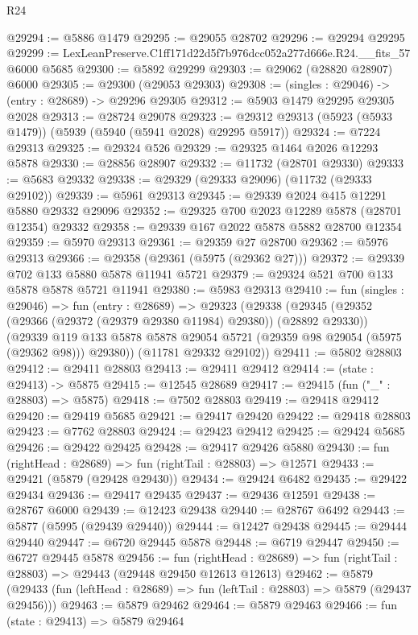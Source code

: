 \begin{lexlean}{R24}
\begin{coremodule}
@29294 := @5886 @1479
@29295 := @29055 @28702
@29296 := @29294 @29295
@29299 := LexLeanPreserve.C1ff171d22d5f7b976dcc052a277d666e.R24.__fits_57 @6000 @5685
@29300 := @5892 @29299
@29303 := @29062 (@28820 @28907) @6000
@29305 := @29300 (@29053 @29303)
@29308 := (singles : @29046) -> (entry : @28689) -> @29296 @29305
@29312 := @5903 @1479 @29295 @29305 @2028
@29313 := @28724 @29078
@29323 := @29312 @29313 (@5923 (@5933 @1479)) (@5939 (@5940 (@5941 @2028) @29295 @5917))
@29324 := @7224 @29313
@29325 := @29324 @526
@29329 := @29325 @1464 @2026 @12293 @5878
@29330 := @28856 @28907
@29332 := @11732 (@28701 @29330)
@29333 := @5683 @29332
@29338 := @29329 (@29333 @29096) (@11732 (@29333 @29102))
@29339 := @5961 @29313
@29345 := @29339 @2024 @415 @12291 @5880 @29332 @29096
@29352 := @29325 @700 @2023 @12289 @5878 (@28701 @12354) @29332
@29358 := @29339 @167 @2022 @5878 @5882 @28700 @12354
@29359 := @5970 @29313
@29361 := @29359 @27 @28700
@29362 := @5976 @29313
@29366 := @29358 (@29361 (@5975 (@29362 @27)))
@29372 := @29339 @702 @133 @5880 @5878 @11941 @5721
@29379 := @29324 @521 @700 @133 @5878 @5878 @5721 @11941
@29380 := @5983 @29313
@29410 := fun (singles : @29046) =>
  fun (entry : @28689) =>
  @29323
    (@29338
      (@29345
        (@29352 (@29366 (@29372 (@29379 @29380 @11984) @29380)) (@28892 @29330))
        (@29339 @119 @133 @5878 @5878 @29054 @5721 (@29359 @98 @29054 (@5975 (@29362 @98))) @29380))
      (@11781 @29332 @29102))
@29411 := @5802 @28803
@29412 := @29411 @28803
@29413 := @29411 @29412
@29414 := (state : @29413) -> @5875
@29415 := @12545 @28689
@29417 := @29415 (fun ("_" : @28803) => @5875)
@29418 := @7502 @28803
@29419 := @29418 @29412
@29420 := @29419 @5685
@29421 := @29417 @29420
@29422 := @29418 @28803
@29423 := @7762 @28803
@29424 := @29423 @29412
@29425 := @29424 @5685
@29426 := @29422 @29425
@29428 := @29417 @29426 @5880
@29430 := fun (rightHead : @28689) => fun (rightTail : @28803) => @12571
@29433 := @29421 (@5879 (@29428 @29430))
@29434 := @29424 @6482
@29435 := @29422 @29434
@29436 := @29417 @29435
@29437 := @29436 @12591
@29438 := @28767 @6000
@29439 := @12423 @29438
@29440 := @28767 @6492
@29443 := @5877 (@5995 (@29439 @29440))
@29444 := @12427 @29438
@29445 := @29444 @29440
@29447 := @6720 @29445 @5878
@29448 := @6719 @29447
@29450 := @6727 @29445 @5878
@29456 := fun (rightHead : @28689) =>
  fun (rightTail : @28803) => @29443 (@29448 @29450 @12613 @12613)
@29462 := @5879
    (@29433 (fun (leftHead : @28689) => fun (leftTail : @28803) => @5879 (@29437 @29456)))
@29463 := @5879 @29462
@29464 := @5879 @29463
@29466 := fun (state : @29413) => @5879 @29464

\end{coremodule}
\end{lexlean}
